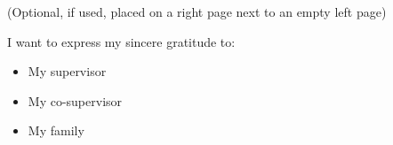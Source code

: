 

\begin{acknowledgement}
(Optional, if used, placed on a right page next to an empty left page)

I want to express my sincere gratitude to:

\begin{itemize}
 \item My supervisor
 \vspace*{3mm}
 \item My co-supervisor
 \vspace*{3mm}
 \item My family
 \vspace*{3mm}
\end{itemize}

\newpage
\end{acknowledgement}